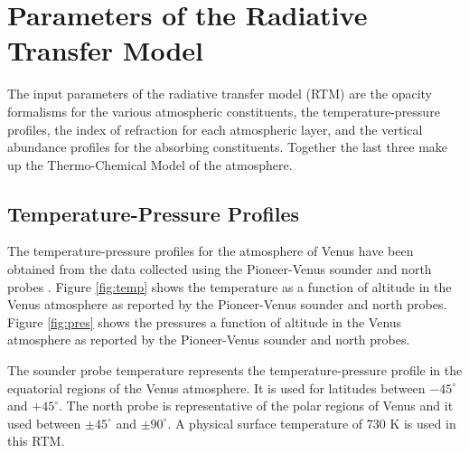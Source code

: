 \section{Parameters of the Radiative Transfer Model}
The input parameters of the radiative transfer model (RTM) are the opacity formalisms for the various atmospheric constituents, the temperature-pressure profiles, the index of refraction for each atmospheric layer, and the vertical abundance profiles for the absorbing constituents. Together the last three make up the Thermo-Chemical Model of the atmosphere.
\subsection{Temperature-Pressure Profiles}
The temperature-pressure profiles for the atmosphere of Venus have been obtained from the data collected using the Pioneer-Venus sounder and north probes \cite{Seiff-1980}. Figure \ref{fig:temp} shows the temperature as a function of altitude in the Venus atmosphere as reported by the Pioneer-Venus sounder and north probes. Figure \ref{fig:pres} shows the pressures a function of altitude in the Venus atmosphere as reported by the Pioneer-Venus sounder and north probes.

The sounder probe temperature represents the temperature-pressure profile in the equatorial regions of the Venus atmosphere. It is used for latitudes between $-45^\circ$ and $+45^\circ$. The north probe is representative of the polar regions of Venus and it used between $\pm 45^\circ$ and $\pm90^\circ$. A physical surface temperature of 730 K is used in this RTM.

